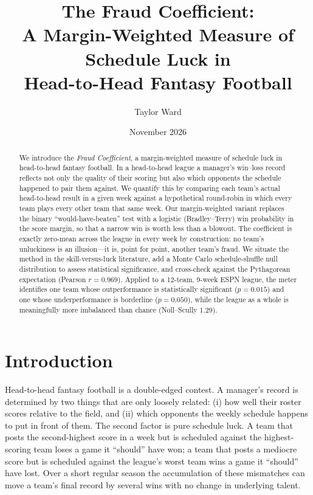 \documentclass[11pt]{article}
\title{\bfseries The Fraud Coefficient:\\
A Margin-Weighted Measure of Schedule Luck in\\
Head-to-Head Fantasy Football}
\author{Taylor Ward}
\date{November 2026}
\begin{document}
\maketitle

\begin{abstract}
We introduce the \emph{Fraud Coefficient}, a margin-weighted measure of
schedule luck in head-to-head fantasy football. In a head-to-head league a
manager's win--loss record reflects not only the quality of their scoring but
also which opponents the schedule happened to pair them against. We quantify
this by comparing each team's actual head-to-head result in a given week
against a hypothetical round-robin in which every team plays every other team
that same week. Our margin-weighted variant replaces the binary
``would-have-beaten'' test with a logistic (Bradley--Terry) win probability in
the score margin, so that a narrow win is worth less than a blowout. The
coefficient is exactly zero-mean across the league in every week by
construction: no team's unluckiness is an illusion---it is, point for point,
another team's fraud. We situate the method in the skill-versus-luck
literature, add a Monte Carlo schedule-shuffle null distribution to assess
statistical significance, and cross-check against the Pythagorean expectation
(Pearson $r=0.969$). Applied to a 12-team, 9-week ESPN league, the meter
identifies one team whose outperformance is statistically significant
($p=0.015$) and one whose underperformance is borderline ($p=0.050$), while
the league as a whole is meaningfully more imbalanced than chance
(Noll--Scully $1.29$).
\end{abstract}

\section{Introduction}
\label{sec:intro}

Head-to-head fantasy football is a double-edged contest. A manager's record is
determined by two things that are only loosely related: (i) how well their
roster scores relative to the field, and (ii) which opponents the weekly
schedule happens to put in front of them. The second factor is pure schedule
luck. A team that posts the second-highest score in a week but is scheduled
against the highest-scoring team loses a game it ``should'' have won; a team
that posts a mediocre score but is scheduled against the league's worst team
wins a game it ``should'' have lost. Over a short regular season the
accumulation of these mismatches can move a team's final record by several
wins with no change in underlying talent.
\end{document}
